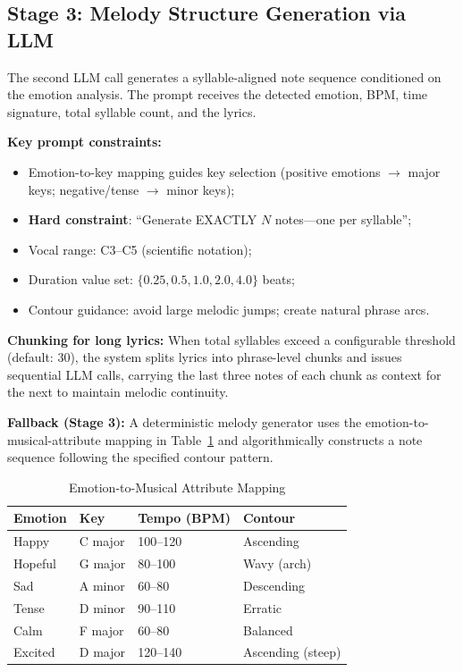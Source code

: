 \documentclass[conference]{IEEEtran}
\begin{document}
\subsection{Stage 3: Melody Structure Generation via LLM}

The second LLM call generates a syllable-aligned note sequence conditioned on
the emotion analysis. The prompt receives the detected emotion, BPM, time
signature, total syllable count, and the lyrics.

\textbf{Key prompt constraints:}
\begin{itemize}
  \item Emotion-to-key mapping guides key selection (positive emotions $\to$
        major keys; negative/tense $\to$ minor keys);
  \item \textbf{Hard constraint}: ``Generate EXACTLY $N$ notes---one per syllable'';
  \item Vocal range: C3--C5 (scientific notation);
  \item Duration value set: $\{0.25, 0.5, 1.0, 2.0, 4.0\}$ beats;
  \item Contour guidance: avoid large melodic jumps; create natural phrase arcs.
\end{itemize}

\textbf{Chunking for long lyrics:} When total syllables exceed a configurable
threshold (default: 30), the system splits lyrics into phrase-level chunks and
issues sequential LLM calls, carrying the last three notes of each chunk as
context for the next to maintain melodic continuity.

\textbf{Fallback (Stage 3):} A deterministic melody generator uses the
emotion-to-musical-attribute mapping in Table~\ref{tab:emotion_mapping} and
algorithmically constructs a note sequence following the specified contour
pattern.

\begin{table}[htbp]
\caption{Emotion-to-Musical Attribute Mapping}
\label{tab:emotion_mapping}
\centering
\begin{tabular}{@{}llll@{}}
\toprule
\textbf{Emotion} & \textbf{Key} & \textbf{Tempo (BPM)} & \textbf{Contour} \\
\midrule
Happy      & C major & 100--120 & Ascending \\
Hopeful    & G major & 80--100  & Wavy (arch) \\
Sad        & A minor & 60--80   & Descending \\
Tense      & D minor & 90--110  & Erratic \\
Calm       & F major & 60--80   & Balanced \\
Excited    & D major & 120--140 & Ascending (steep) \\
\bottomrule
\end{tabular}
\end{table}
\end{document}
